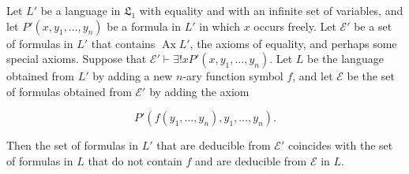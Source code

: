 Let $L'$ be a language in $\mathfrak{L}_1$ with equality and with an infinite set of variables, and let $P'(x, y_1, \ldots, y_n)$ be a formula in $L'$ in which $x$ occurs freely. Let $\mathcal{E}'$ be a set of formulas in $L'$ that contains $\operatorname{Ax} L'$, the axioms of equality, and perhaps some special axioms. Suppose that $\mathcal{E}' \vdash \exists! x P'(x, y_1, \ldots, y_n)$. Let $L$ be the language obtained from $L'$ by adding a new $n$-ary function symbol $f$, and let $\mathcal{E}$ be the set of formulas obtained from $\mathcal{E}'$ by adding the axiom

$$P'(f(y_1, \ldots, y_n), y_1, \ldots, y_n).$$

Then the set of formulas in $L'$ that are deducible from $\mathcal{E}'$ coincides with the set of formulas in $L$ that do not contain $f$ and are deducible from $\mathcal{E}$ in $L$.
